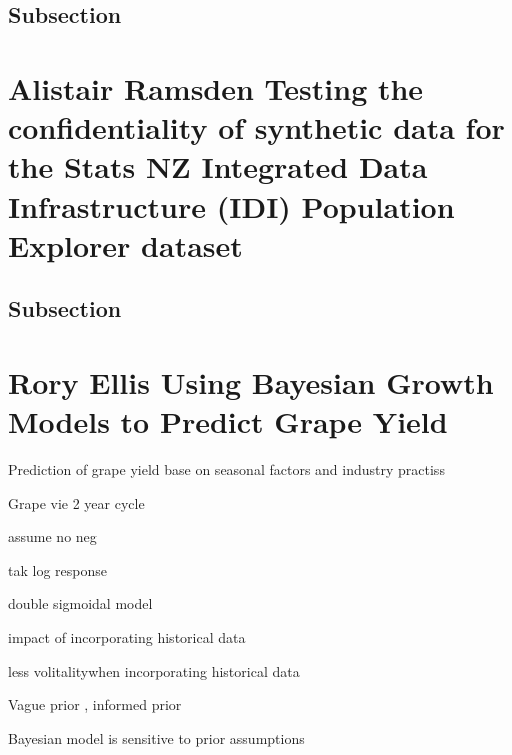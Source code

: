 \documentclass[
]{book}
\begin{document}
\hypertarget{subsection}{%
\section{Subsection}\label{subsection}}

\hypertarget{alistair-ramsden-testing-the-confidentiality-of-synthetic-data-for-the-stats-nz-integrated-data-infrastructure-idi-population-explorer-dataset}{%
\chapter*{Alistair Ramsden \textbar{} Testing the confidentiality of synthetic data for the Stats NZ Integrated Data Infrastructure (IDI) Population Explorer dataset}\label{alistair-ramsden-testing-the-confidentiality-of-synthetic-data-for-the-stats-nz-integrated-data-infrastructure-idi-population-explorer-dataset}}

\hypertarget{subsection}{%
\section{Subsection}\label{subsection}}

\hypertarget{rory-ellis-using-bayesian-growth-models-to-predict-grape-yield}{%
\chapter*{Rory Ellis \textbar{} Using Bayesian Growth Models to Predict Grape Yield}\label{rory-ellis-using-bayesian-growth-models-to-predict-grape-yield}}

Prediction of grape yield base on seasonal factors and industry practiss

Grape vie 2 year cycle

assume no neg

tak log response

double sigmoidal model

impact of incorporating historical data

less volitalitywhen incorporating historical data

Vague prior , informed prior

Bayesian model is sensitive to prior assumptions
\end{document}
